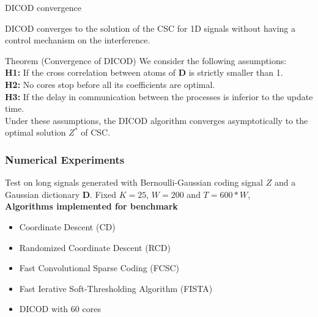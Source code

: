 \documentclass[prez_parietal.tex]{subfiles}
\begin{document}
\begin{frame}{DICOD convergence }

DICOD converges to the solution of the CSC for 1D signals without having a control mechanism on the interference.\\[1em]

\begin{beamerboxesrounded}[upper=my title,lower=my body,shadow=true]{
        Theorem (Convergence of DICOD)}
    We consider the following assumptions:\\[.3em]
    {\bf H1: }
    If the cross correlation between atoms of $\pmb D$ is strictly smaller than 1.\\[.3em]
    {\bf H2: }
    No cores stop before all its coefficients are optimal.\\[.3em]
    {\bf H3: }
    If the delay in communication between the processes is inferior to the update time.\\[1em]
    Under these assumptions, the DICOD algorithm converges asymptotically to the
    optimal solution $Z^*$ of CSC.
\end{beamerboxesrounded}

\end{frame}


\begin{frame}

\frametitle{Numerical Experiments}
Test on long signals generated with Bernoulli-Gaussian
coding signal $Z$ and a Gaussian dictionary $\pmb D$.
Fixed $K = 25$, $W = 200$ and $T = 600*W$,\\[1em]

\textbf{Algorithms implemented for benchmark}
\begin{itemize}
    \item {\color{cd} Coordinate Descent} (CD) \\
    \item {\color{rcd} Randomized Coordinate Descent} (RCD) \\
    \item Fast Convolutional Sparse Coding (FCSC)\\
    \item {\color{fista}Fast Ierative Soft-Thresholding Algorithm (FISTA)} \\
    \item {\color{dicod} DICOD with $60$ cores}
\end{itemize}
\end{frame}
\end{document}
